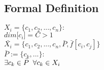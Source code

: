 \documentclass[11pt]{article}
\begin{document}
\subsection{Formal Definition}
\begin{center}
$
X_i = \{ c_1,c_2,...,c_n \} :
$
\\ \vspace{2mm}
$
dim\lbrack c_i \rbrack = C > 1
$
\\ \vspace{4mm} 
$
\bar{X_i} = \{ c_1,c_2,...,c_n,\bar{P},\bar{f}[c_i,c_j] \}
$
\\ \vspace{2mm}
$
\bar{P} := \{c_k,...\} :
$
\\ \vspace{2mm}
$
\exists c_k \in \bar{P} \hspace{2mm} \forall c_k \in X_i
$
\end{center}



\newpage
\end{document}
